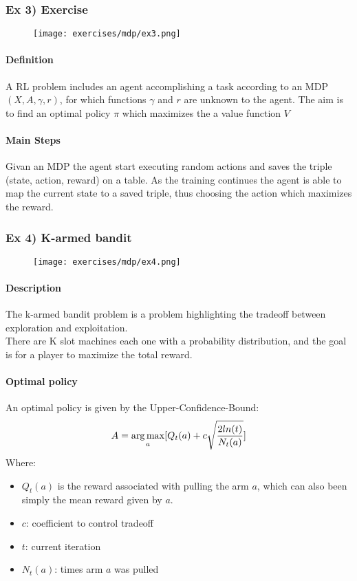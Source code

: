 \subsubsection{Ex 3) Exercise}

\begin{figure}[H]
    \centering
    \texttt{[image: exercises/mdp/ex3.png]}
\end{figure}

\paragraph{Definition}
A RL problem includes an agent accomplishing a task according to an  MDP $(X, A, \gamma, r )$, for which functions $\gamma$ and $r$ are unknown to the agent. The aim is to find an optimal policy $\pi$ which maximizes the a value function $V$ 

\paragraph{Main Steps}
Givan an MDP the agent start executing random actions and saves the triple (state, action, reward) on a table. As the training continues the agent is able to map the current state to a saved triple, thus choosing the action which maximizes the reward.\\

\subsubsection{Ex 4) K-armed bandit}

\begin{figure}[H]
    \centering
    \texttt{[image: exercises/mdp/ex4.png]}
\end{figure}

\paragraph{Description}
The k-armed bandit problem is a problem highlighting the tradeoff between exploration and exploitation.\\
There are K slot machines each one with a probability distribution, and the goal is for a player to maximize the total reward.

\paragraph{Optimal policy}
An optimal policy is given by the Upper-Confidence-Bound:
$$A=\operatorname*{arg\,max}_a[Q_t(a)+c\sqrt{\frac{2ln(t)}{N_t(a)}}]$$
Where:
\begin{itemize}
\item $Q_t(a)$ is the reward associated with pulling the arm $a$, which can also been simply the mean reward given by $a$.
\item $c$: coefficient to control tradeoff
\item $t$: current iteration
\item $N_t(a)$: times arm $a$ was pulled
\end{itemize}





